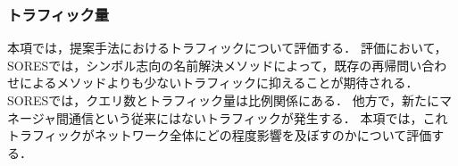 \subsubsection{トラフィック量}
本項では，提案手法におけるトラフィックについて評価する．
評価において，
SORESでは，シンボル志向の名前解決メソッドによって，既存の再帰問い合わせによるメソッドよりも少ないトラフィックに抑えることが期待される．
SORESでは，クエリ数とトラフィック量は比例関係にある．
他方で，新たにマネージャ間通信という従来にはないトラフィックが発生する．
本項では，これトラフィックがネットワーク全体にどの程度影響を及ぼすのかについて評価する．


